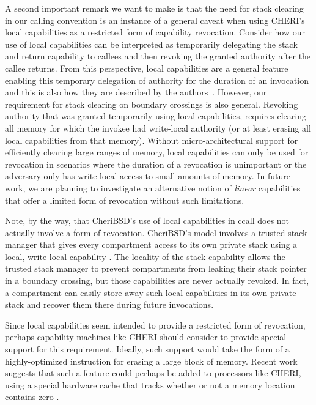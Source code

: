 \documentclass[format=acmsmall, review=true, screen=true]{acmart}
\begin{document}
A second important remark we want to make is that the need for stack clearing in our calling convention is an instance of a general caveat when using CHERI's local capabilities as a restricted form of capability revocation.
Consider how our use of local capabilities can be interpreted as temporarily delegating the stack and return capability to callees and then revoking the granted authority after the callee returns.
From this perspective, local capabilities are a general feature enabling this temporary delegation of authority for the duration of an invocation and this is also how they are described by the authors~\citep{Watson2015Cheri}.
However, our requirement for stack clearing on boundary crossings is also general.
Revoking authority that was granted temporarily using local capabilities, requires clearing all memory for which the invokee had write-local authority (or at least erasing all local capabilities from that memory).
Without micro-architectural support for efficiently clearing large ranges of memory, local capabilities can only be used for revocation in scenarios where the duration of a revocation is unimportant or the adversary only has write-local access to small amounts of memory.
In future work, we are planning to investigate an alternative notion of \emph{linear} capabilities that offer a limited form of revocation without such limitations.

Note, by the way, that CheriBSD's use of local capabilities in ccall does not actually involve a form of revocation.
CheriBSD's model involves a trusted stack manager that gives every compartment access to its own private stack using a local, write-local capability \citep{Watson2015Cheri}.
The locality of the stack capability allows the trusted stack manager to prevent compartments from leaking their stack pointer in a boundary crossing, but those capabilities are never actually revoked.
In fact, a compartment can easily store away such local capabilities in its own private stack and recover them there during future invocations.

Since local capabilities seem intended to provide a restricted form of revocation, perhaps capability machines like CHERI should consider to provide special support for this requirement.
Ideally, such support would take the form of a highly-optimized instruction for erasing a large block of memory.
Recent work suggests that such a feature could perhaps be added to processors like CHERI, using a special hardware cache that tracks whether or not a memory location contains zero \citep{Joannou2017EfficientTaggedMemory}.
\end{document}
